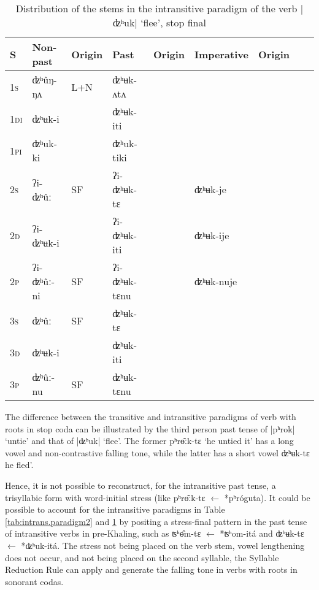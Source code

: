 \documentclass[oldfontcommands,oneside,a4paper,11pt]{article}
\newcommand{\ipa}[1]{{\phon \mbox{#1}}} %
\begin{document}
\begin{table}[h]
\caption{Distribution of the stems in the intransitive paradigm of the verb |ʣʰuk| `flee', stop final} \label{tab:intrans.paradigm3} \centering
\begin{tabular}{lllllllll}
\toprule
S & Non-past & Origin & Past & Origin & Imperative & Origin \\
\midrule
\textsc{1s} & \ipa{ʣʰûŋ-ŋʌ} &L+N & \ipa{ʣʰʉk-ʌtʌ} &\\
\textsc{1di} & \ipa{ʣʰʉk-i} && \ipa{ʣʰʉk-iti}& \\
\textsc{1pi} & \ipa{ʣʰuk-ki} && \ipa{ʣʰuk-tiki} &&\\
\textsc{2s} & \ipa{ʔi-ʣʰûː} &SF &\ipa{ʔi-ʣʰʉk-tɛ}  & &\ipa{ʣʰʉk-je}& \\
\textsc{2d} & \ipa{ʔi-ʣʰʉk-i}  & &\ipa{ʔi-ʣʰʉk-iti} &&\ipa{ʣʰʉk-ije} &\\
\textsc{2p} & \ipa{ʔi-ʣʰûː-ni} &SF& \ipa{ʔi-ʣʰʉk-tɛnu} & &\ipa{ʣʰʉk-nuje}& \\
\textsc{3s} & \ipa{ʣʰûː} & SF&\ipa{ʣʰʉk-tɛ} & \\
\textsc{3d} & \ipa{ʣʰʉk-i} & &\ipa{ʣʰʉk-iti} &\\
\textsc{3p} & \ipa{ʣʰûː-nu} &SF& \ipa{ʣʰʉk-tɛnu} & \\
\bottomrule
\end{tabular}
\end{table}

The difference between the transitive and intransitive paradigms of verb with roots in stop coda can be illustrated by the third person past tense of |pʰrok| `untie' and that of |ʣʰuk| `flee'. The former \ipa{pʰrɵ̂ːk-tɛ} `he untied it' has a long vowel and non-contrastive falling tone, while the latter has a short vowel \ipa{ʣʰʉk-tɛ}  he fled'.

Hence, it is not possible to reconstruct, for the intransitive past tense, a trisyllabic form with word-initial stress (like  \ipa{pʰrɵ̂ːk-tɛ} $\leftarrow$ \ipa{*pʰróguta}). It could be possible to account for the intransitive paradigms in Table \ref{tab:intrans.paradigm2} and \ref{tab:intrans.paradigm3} by positing a stress-final pattern in the past tense of intransitive verbs in pre-Khaling, such as \ipa{ʦʰɵ̂m-tɛ} $\leftarrow$  \ipa{*ʦʰom-itá} and \ipa{ʣʰʉk-tɛ} $\leftarrow$ \ipa{*ʣʰuk-itá}.  The stress not being placed on the verb stem, vowel lengthening does not occur, and not being placed on the second syllable, the Syllable Reduction Rule can apply and generate the falling tone in verbs with roots in sonorant codas.
\end{document}
